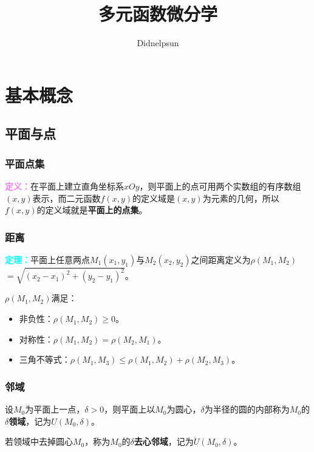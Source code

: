 \documentclass[UTF8, 12pt]{ctexart}
\author{Didnelpsun}
\title{多元函数微分学}
\date{}
\begin{document}
\maketitle
\pagestyle{empty}
\thispagestyle{empty}
\tableofcontents
\thispagestyle{empty}
\newpage
\pagestyle{plain}
\setcounter{page}{1}
\section{基本概念}
\subsection{平面与点}
\subsubsection{平面点集}

\textcolor{violet}{\textbf{定义：}}在平面上建立直角坐标系$xOy$，则平面上的点可用两个实数组的有序数组$(x,y)$表示，而二元函数$f(x,y)$的定义域是$(x,y)$为元素的几何，所以$f(x,y)$的定义域就是\textbf{平面上的点集}。

\subsubsection{距离}

\textcolor{aqua}{\textbf{定理：}}平面上任意两点$M_1(x_1,y_1)$与$M_2(x_2,y_2)$之间距离定义为$\rho(M_1,M_2)$\\$=\sqrt{(x_2-x_1)^2+(y_2-y_1)^2}$。

$\rho(M_1,M_2)$满足：

\begin{itemize}
    \item 非负性：$\rho(M_1,M_2)\geqslant0$。
    \item 对称性：$\rho(M_1,M_2)=\rho(M_2,M_1)$。
    \item 三角不等式：$\rho(M_1,M_3)\leqslant\rho(M_1,M_2)+\rho(M_2,M_3)$。
\end{itemize}

\subsubsection{邻域}

设$M_0$为平面上一点，$\delta>0$，则平面上以$M_0$为圆心，$\delta$为半径的圆的内部称为$M_0$的\textbf{$\delta$领域}，记为$U(M_0,\delta)$。

若领域中去掉圆心$M_0$，称为$M_0$的\textbf{$\delta$去心邻域}，记为$\mathring{U}(M_0,\delta)$。
\end{document}
